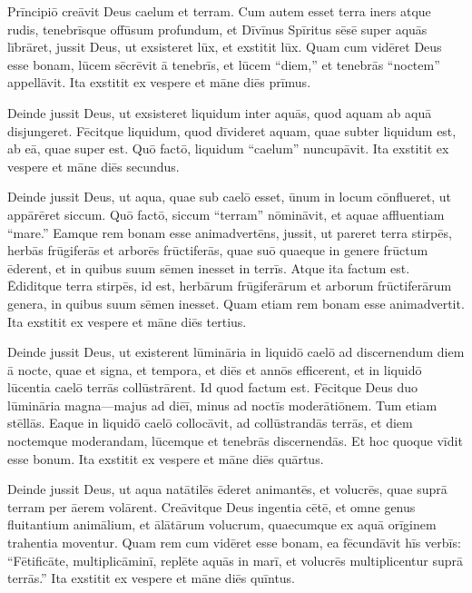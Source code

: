 

\Caput
\Versus Prīncipiō creāvit Deus caelum et terram.
\Versus Cum autem esset terra iners atque rudis, tenebrīsque offūsum profundum, et Dīvīnus Spīritus sēsē super aquās lībrāret,
\Versus jussit Deus, ut exsisteret lūx, et exstitit lūx.
\Versus Quam cum vidēret Deus esse bonam, lūcem sēcrēvit ā tenebrīs,
\Versus et lūcem ``diem,'' et tenebrās ``noctem'' appellāvit. Ita exstitit ex vespere et māne diēs prīmus.%

\Versus Deinde jussit Deus, ut exsisteret liquidum inter aquās, quod aquam ab aquā disjungeret.
\Versus Fēcitque liquidum, quod dīvideret aquam, quae subter liquidum est, ab eā, quae super est.
\Versus Quō factō, liquidum ``caelum'' nuncupāvit. Ita exstitit ex vespere et māne diēs secundus.

\Versus Deinde jussit Deus, ut aqua, quae sub caelō esset, ūnum in locum cōnflueret, ut appārēret siccum.
\Versus Quō factō, siccum ``terram'' nōmināvit, et aquae affluentiam ``mare.'' Eamque rem bonam esse animadvertēns, 
\Versus jussit, ut pareret terra stirpēs, herbās frūgiferās et arborēs frūctiferās, quae suō quaeque in genere frūctum ēderent, et in quibus suum sēmen inesset in terrīs. Atque ita factum est.
\Versus Ēdiditque terra stirpēs, id est, herbārum frūgiferārum et arborum frūctiferārum genera, in quibus suum sēmen inesset. Quam etiam rem bonam esse animadvertit.
\Versus Ita exstitit ex vespere et māne diēs tertius.

\Versus Deinde jussit Deus, ut existerent lūmināria in liquidō caelō ad discernendum diem ā nocte, quae et signa, et tempora, et diēs et annōs efficerent,
\Versus et in liquidō lūcentia caelō terrās collūstrārent. Id quod factum est.
\Versus Fēcitque Deus duo lūmināria magna—majus ad diēī, minus ad noctīs moderātiōnem. Tum etiam stēllās.
\Versus Eaque in liquidō caelō collocāvit, ad collūstrandās terrās,
\Versus et diem noctemque moderandam, lūcemque et tenebrās discernendās. Et hoc quoque vīdit esse bonum.
\Versus Ita exstitit ex vespere et māne diēs quārtus.

\Versus Deinde jussit Deus, ut aqua natātilēs ēderet animantēs, et volucrēs, quae suprā terram per āerem volārent.
\Versus Creāvitque Deus ingentia cētē, et omne genus fluitantium animālium, et ālātārum volucrum, quaecumque ex aquā orīginem trahentia moventur. Quam rem cum vidēret esse bonam,
\Versus ea fēcundāvit hīs verbīs: ``Fētificāte, multiplicāminī, replēte aquās in marī, et volucrēs multiplicentur suprā terrās.''
\Versus Ita exstitit ex vespere et māne diēs quīntus.

